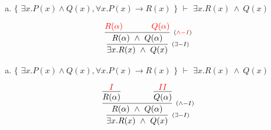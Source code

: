 \documentclass[aspectratio=43]{beamer}
\begin{document}
    \begin{frame}[fragile]
    
    	\begin{enumerate}[d)]
			\item $\{$ $\exists x.P(x)\land Q(x), \forall x.P(x)\to R(x)$ $\}$ $\vdash$ $\exists x.R(x)\ \land\ Q(x) $\\
		\end{enumerate}
        
        \vspace{80pt}
        
        \[
        \begin{array}{c}
		
        	\infer[_{(\exists -I)}]
            	{\exists  x. R(x)\ \land\ Q(x)}
            	{\infer[_{(\textcolor{red}{\land -I})}] 
                	{R(\alpha)\ \land\ Q(\alpha)}
                	{\textcolor{red}{R(\alpha) \hspace{35pt} Q(\alpha)}}
                }
        
		\end{array}
        \]
        
	\end{frame}
    
    \begin{frame}[fragile]
    
    	\begin{enumerate}[d)]
			\item $\{$ $\exists x.P(x)\land Q(x), \forall x.P(x)\to R(x)$ $\}$ $\vdash$ $\exists x.R(x)\ \land\ Q(x) $\\
		\end{enumerate}
        
        \vspace{80pt}
        
        \[
        \begin{array}{c}
		
        	\infer[_{(\exists -I)}]
            	{\exists  x. R(x)\ \land\ Q(x)}
            	{\infer[_{(\land -I)}] 
                	{R(\alpha)\ \land\ Q(\alpha)}
                	{\infer[] 
                    	{R(\alpha)} 
                        {\textcolor{red}{I}} \hspace{35pt}
                     \infer[] 
                     	{Q(\alpha)}
                     	{\textcolor{red}{II}}
                    }
                }
        
		\end{array}
        \]
        
	\end{frame}
    
\end{document}
